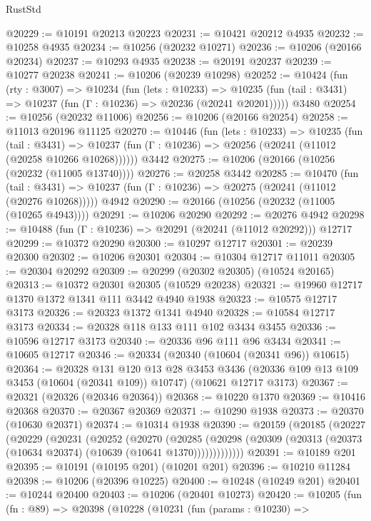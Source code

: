 \begin{lexlean}{RustStd}
\begin{coremodule}
@20229 := @10191 @20213 @20223
@20231 := @10421 @20212 @4935
@20232 := @10258 @4935
@20234 := @10256 (@20232 @10271)
@20236 := @10206 (@20166 @20234)
@20237 := @10293 @4935
@20238 := @20191 @20237
@20239 := @10277 @20238
@20241 := @10206 (@20239 @10298)
@20252 := @10424
    (fun (rty : @3007) =>
    @10234
      (fun (lets : @10233) =>
      @10235 (fun (tail : @3431) => @10237 (fun (Γ : @10236) => @20236 (@20241 @20201)))))
    @3480
@20254 := @10256 (@20232 @11006)
@20256 := @10206 (@20166 @20254)
@20258 := @11013 @20196 @11125
@20270 := @10446
    (fun (lets : @10233) =>
    @10235
      (fun (tail : @3431) =>
      @10237 (fun (Γ : @10236) => @20256 (@20241 (@11012 (@20258 @10266 @10268))))))
    @3442
@20275 := @10206 (@20166 (@10256 (@20232 (@11005 @13740))))
@20276 := @20258 @3442
@20285 := @10470
    (fun (tail : @3431) => @10237 (fun (Γ : @10236) => @20275 (@20241 (@11012 (@20276 @10268)))))
    @4942
@20290 := @20166 (@10256 (@20232 (@11005 (@10265 @4943))))
@20291 := @10206 @20290
@20292 := @20276 @4942
@20298 := @10488 (fun (Γ : @10236) => @20291 (@20241 (@11012 @20292))) @12717
@20299 := @10372 @20290
@20300 := @10297 @12717
@20301 := @20239 @20300
@20302 := @10206 @20301
@20304 := @10304 @12717 @11011
@20305 := @20304 @20292
@20309 := @20299 (@20302 @20305) (@10524 @20165)
@20313 := @10372 @20301 @20305 (@10529 @20238)
@20321 := @19960 @12717 @1370 @1372 @1341 @111 @3442 @4940 @1938
@20323 := @10575 @12717 @3173
@20326 := @20323 @1372 @1341 @4940
@20328 := @10584 @12717 @3173
@20334 := @20328 @118 @133 @111 @102 @3434 @3455
@20336 := @10596 @12717 @3173
@20340 := @20336 @96 @111 @96 @3434
@20341 := @10605 @12717
@20346 := @20334 (@20340 (@10604 (@20341 @96)) @10615)
@20364 := @20328
    @131
    @120
    @13
    @28
    @3453
    @3436
    (@20336 @109 @13 @109 @3453 (@10604 (@20341 @109)) @10747)
    (@10621 @12717 @3173)
@20367 := @20321 (@20326 (@20346 @20364))
@20368 := @10220 @1370
@20369 := @10416 @20368
@20370 := @20367 @20369
@20371 := @10290 @1938
@20373 := @20370 (@10630 @20371)
@20374 := @10314 @1938
@20390 := @20159
    (@20185
      (@20227
        (@20229
          (@20231
            (@20252
              (@20270
                (@20285
                  (@20298 (@20309 (@20313 (@20373 (@10634 @20374) (@10639 (@10641 @1370)))))))))))))
@20391 := @10189 @201
@20395 := @10191 (@10195 @201) (@10201 @201)
@20396 := @10210 @11284
@20398 := @10206 (@20396 @10225)
@20400 := @10248 (@10249 @201)
@20401 := @10244 @20400
@20403 := @10206 (@20401 @10273)
@20420 := @10205
    (fun (fn : @89) =>
    @20398
      (@10228
        (@10231
          (fun (params : @10230) =>

\end{coremodule}
\end{lexlean}
